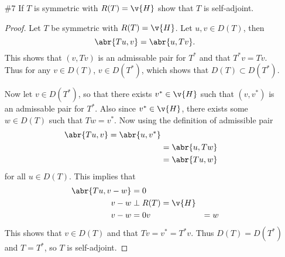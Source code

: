 \documentclass[11pt, oneside]{article}
\begin{document}
\begin{enumerate}
\begin{proof}
      \begin{align*}
        u(1) &= \dintt{0}{1}{G(y) - iv(y)}{y} \\
        &= \dintt{0}{1}{\dintt{0}{y}{g(s)}{s} + \alpha - iv(y)}{y} \\
        &= \alpha - i\dintt{0}{1}{v(y)}{y} + \dintt{0}{1}{\dintt{0}{y}{g(s)}{s}}{y}
        \intertext{Substituting in for $\alpha$}
        &= i\dintt{0}{1}{v(y)}{y} - \dintt{0}{1}{\dintt{0}{y}{g(s)}{s}}{y} - i\dintt{0}{1}{v(y)}{y} + \dintt{0}{1}{\dintt{0}{y}{g(s)}{s}}{y} \\
        &= 0
      \end{align*}
      Now using this function we see that
      \begin{align*}
        \dintt{0}{1}{\abs{G(x) - iv(x)}^2}{x} &= 0 \\
        \norm{G - iv} &= 0 \\
        G - iv &= 0 \\
        G &= iv \\
      \end{align*}
      Since $G' = g \in L^2(0, 1)$ is differentiable this implies that
      $v' = -iG' \in L^2(0, 1)$.
      Also $v(0) = -iG(0) = -iG(1) = v(1)$ because $G(0) = G(1)$.
      This shows that $v \in D(T_1)$ and that $T_1^* v = g = iv'$.
      Therefore $T_1^* = T_1$.
    \end{proof}

  \pagebreak
  \item[\#7] %
    If $T$ is symmetric with $R(T) = \v{H}$ show that $T$ is self-adjoint.

    \begin{proof}
      Let $T$ be symmetric with $R(T) = \v{H}$.
      Let $u, v \in D(T)$, then
      \[
        \abr{Tu, v} = \abr{u, Tv}.
      \]
      This shows that $(v, Tv)$ is an admissable pair for $T^*$ and that
      $T^* v = Tv$.
      Thus for any $v \in D(T)$, $v \in D(T^*)$, which shows that
      $D(T) \subset D(T^*)$.

      Now let $v \in D(T^*)$, so that there exists $v^* \in \v{H}$ such that
      $(v, v^*)$ is an admissable pair for $T^*$.
      Also since $v^* \in \v{H}$, there exists some $w \in D(T)$ such that
      $Tw = v^*$.
      Now using the definition of admissible pair
      \begin{align*}
        \abr{Tu, v} = \abr{u, v^*} \\
        &= \abr{u, Tw} \\
        &= \abr{Tu, w}
      \end{align*}
      for all $u \in D(T)$.
      This implies that
      \begin{align*}
        \abr{Tu, v - w} &= 0 \\
        v - w &\perp R(T) = \v{H}\\
        v - w &= 0
        v &= w
      \end{align*}
      This shows that $v \in D(T)$ and that $Tv = v^* = T^* v$.
      Thus $D(T) = D(T^*)$ and $T = T^*$, so $T$ is self-adjoint.
    \end{proof}


\end{enumerate}
\end{document}
